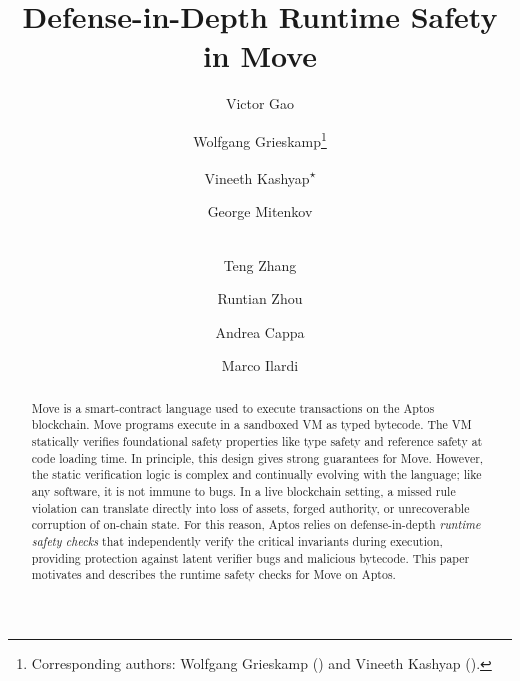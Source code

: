 \documentclass[runningheads]{llncs}
\begin{document}
\title{Defense-in-Depth Runtime Safety in Move}

\author{Victor Gao \and
        Wolfgang Grieskamp\thanks{Corresponding authors: Wolfgang Grieskamp () and Vineeth Kashyap ().} \and
        Vineeth Kashyap\textsuperscript{$\star$} \and
        George Mitenkov \and \\
        Teng Zhang \and
        Runtian Zhou \and
        Andrea Cappa \and
        Marco Ilardi}

\maketitle

\begin{abstract}
Move is a smart-contract language used to execute transactions on the Aptos blockchain.
Move programs execute in a sandboxed VM as typed bytecode.
The VM statically verifies foundational safety properties like type safety and reference safety at code loading time.
In principle, this design gives strong guarantees for Move.
However, the static verification logic is complex and continually evolving with the language; like any software, it is not immune to bugs.
In a live blockchain setting, a missed rule violation can translate directly into loss of assets, forged authority, or unrecoverable corruption of on-chain state.
For this reason, Aptos relies on defense-in-depth \emph{runtime safety checks} that independently verify the critical invariants during execution, providing protection against latent verifier bugs and malicious bytecode.
This paper motivates and describes the runtime safety checks for Move on Aptos.
\end{abstract}








\end{document}
